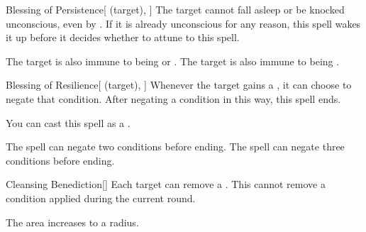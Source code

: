 \lowercase{\hypertarget{spell:Blessing of Persistence}{}}\label{spell:Blessing of Persistence}
\begin{attuneability}[Rank 4]{\hypertarget{spell:Blessing of Persistence}{Blessing of Persistence}}[ (target), ]
The target cannot fall asleep or be knocked unconscious, even by .
If it is already unconscious for any reason, this spell wakes it up before it decides whether to attune to this spell.


\rankline
{} The target is also immune to being  or .
 The target is also immune to being .
\end{attuneability}
\vspace{0.25em}



\lowercase{\hypertarget{spell:Blessing of Resilience}{}}\label{spell:Blessing of Resilience}
\begin{attuneability}[Rank 4]{\hypertarget{spell:Blessing of Resilience}{Blessing of Resilience}}[ (target), ]
Whenever the target gains a , it can choose to negate that condition.
After negating a condition in this way, this spell ends.

You can cast this spell as a .

\rankline
{} The spell can negate two conditions before ending.
 The spell can negate three conditions before ending.
\end{attuneability}
\vspace{0.25em}



\lowercase{\hypertarget{spell:Cleansing Benediction}{}}\label{spell:Cleansing Benediction}
\begin{freeability}[Rank 6]{\hypertarget{spell:Cleansing Benediction}{Cleansing Benediction}}[]
Each target can remove a .
This cannot remove a condition applied during the current round.

\rankline
{} The area increases to a \arealarge radius.
\end{freeability}
\vspace{0.25em}



